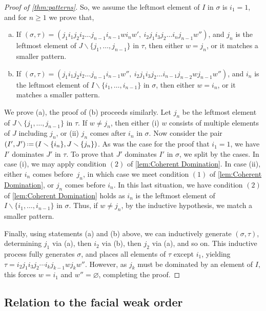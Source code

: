\documentclass{amsart}
\theoremstyle{definition}
\newcommand{\ssm}{\smallsetminus} %
\newcommand{\eqdef}{\mbox{\,\raisebox{0.2ex}{\scriptsize\ensuremath{\mathrm:}}\ensuremath{=}\,}} %
\begin{document}
\begin{proof}[Proof of \cref{thm:patterns}]
So, we assume the leftmost element of $I$ in $\sigma$ is $i_1=1$, and for $n\geq1$ we prove that,
\begin{enumerate}[(a)]
\item If $(\sigma,\tau)=(j_1 i_1 j_2 i_2 \dots j_{n-1} i_{n-1} w i_{n} w', \ i_2 j_1 i_3 j_2 \dots i_{n}j_{n-1}w'') $, and $j_n$ is the leftmost element of $J\ssm \{j_1, \dots, j_{n-1}\}$ in $\tau$, then either $w = j_n$, or it matches a smaller pattern.
\item If $(\sigma,\tau)=(j_1 i_1 j_2 i_2 \dots j_{n-1} i_{n-1} w'', \ i_2 j_1 i_3 j_2 \dots i_{n-1}j_{n-2} w j_{n-1} w'')$, and $i_n$ is the leftmost element of ${I\ssm \{i_1, \dots, i_{n-1}\}}$ in $\sigma$, then either $w = i_n$, or it matches a smaller pattern.
\end{enumerate}
We prove (a), the proof of (b) proceeds similarly. 
Let $j_n$ be the leftmost element of $J\ssm \{j_1, \dots, j_{n-1} \}$ in $\tau$.
If $w\neq j_n$, then either (i) $w$ consists of multiple elements of $J$ including $j_n$, or (ii) $j_n$ comes after $i_n$ in $\sigma$.
Now consider the pair $(I',J') \eqdef (I\ssm \{i_n\}, J \ssm \{j_n\})$.
As was the case for the proof that $i_1=1$, we have $I'$ dominates $J'$ in $\tau$.
To prove that $J'$ dominates $I'$ in $\sigma$, we split by the cases.
In case (i), we may apply condition $(2)$ of \cref{lem:Coherent Domination}.
In case (ii), either $i_n$ comes before~$j_n$, in which case we meet condition $(1)$ of \cref{lem:Coherent Domination}, or $j_n$ comes before $i_n$.
In this last situation, we have condition $(2)$ of \cref{lem:Coherent Domination} holds as $i_n$ is the leftmost element of~${I\ssm \{i_1, \dots, i_{n-1}\}}$ in $\sigma$.
Thus, if $w \neq j_n$, by the inductive hypothesis, we match a smaller pattern.

Finally, using statements (a) and (b) above, we can inductively generate $(\sigma,\tau)$, determining $j_1$ via (a), then $i_2$ via (b), then $j_2$ via (a), and so on.
This inductive process fully generates $\sigma$, and places all elements of $\tau$ except $i_1$, yielding $\tau=i_2 j_1 i_3 j_2 \cdots i_k j_{k-1} w j_k w''$.
However, as $j_k$ must be dominated by an element of $I$, this forces $w = i_1$ and $w'' =\varnothing$, completing the proof.
\end{proof}

\subsection{Relation to the facial weak order}
\label{sec:facial-weak-order}
\end{document}
